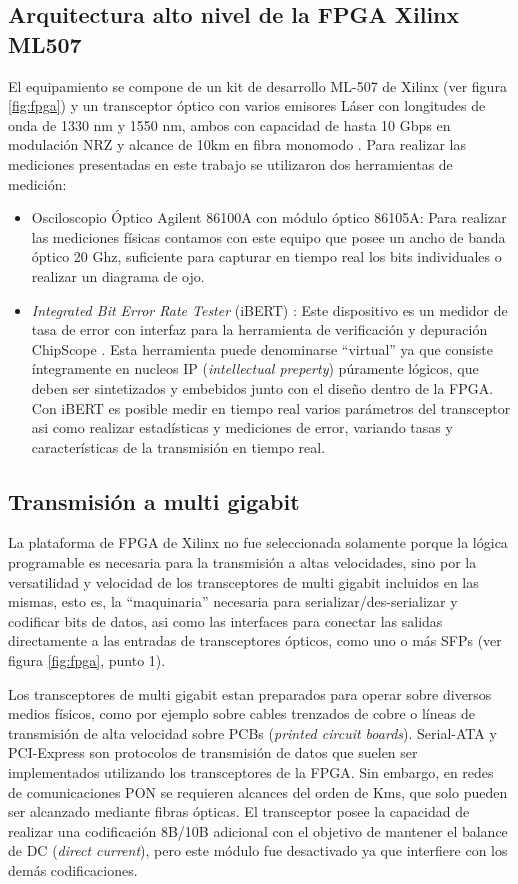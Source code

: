 \subsection{Arquitectura alto nivel de la FPGA Xilinx ML507}
El equipamiento se compone de un kit de desarrollo ML-507 de Xilinx \cite{virtex5fpga} (ver figura \ref{fig:fpga}) y un transceptor óptico con varios emisores Láser con longitudes de onda de 1330 nm y 1550 nm, ambos con capacidad de hasta 10 Gbps en modulación NRZ y alcance de 10km en fibra monomodo \cite{virtex5fpgaRIO}. Para realizar las mediciones presentadas en este trabajo se utilizaron dos herramientas de medición:
\begin{itemize}
 \item Osciloscopio Óptico Agilent 86100A con módulo óptico 86105A: Para
realizar las mediciones físicas contamos con este equipo que posee un
ancho de banda óptico 20 Ghz, suficiente para capturar en
tiempo real los bits individuales o realizar un diagrama de ojo.
\item {\em Integrated Bit Error Rate Tester} (iBERT) \cite{4gtxs}: Este dispositivo es un medidor de tasa de error con interfaz para la herramienta de
verificación y depuración ChipScope \cite{arshak2006testing}. Esta herramienta puede denominarse ``virtual'' ya que consiste íntegramente en nucleos IP (\textit{intellectual preperty}) púramente lógicos, que deben ser sintetizados y embebidos junto con el diseño dentro de la FPGA.
Con iBERT es posible medir en tiempo real varios parámetros del transceptor asi como realizar estadísticas y mediciones de error, variando tasas y características de la transmisión en tiempo real.
 
\end{itemize}
\subsection{Transmisión a multi gigabit}
La plataforma de FPGA de Xilinx no fue seleccionada solamente porque la lógica programable es necesaria para la transmisión a altas velocidades, sino por la versatilidad y velocidad de los transceptores de multi gigabit incluidos en las mismas, esto es, la ``maquinaria'' necesaria para serializar/des-serializar y codificar bits de datos, asi como las interfaces para conectar las salidas directamente a las entradas de transceptores ópticos, como uno o más SFPs \cite{ug198} (ver figura \ref{fig:fpga}, punto 1).

Los transceptores de multi gigabit estan preparados para operar sobre diversos medios físicos, como por ejemplo sobre cables trenzados de cobre o líneas de transmisión de alta velocidad sobre PCBs (\textit{printed circuit boards}). Serial-ATA y PCI-Express son protocolos de transmisión de datos que suelen ser implementados utilizando los transceptores de la FPGA. Sin embargo, en redes de comunicaciones PON se requieren alcances del orden de Kms, que solo pueden ser alcanzado mediante fibras ópticas.  El transceptor posee la capacidad de realizar una codificación 8B/10B \cite{widmer1983dc} adicional con el objetivo de mantener el balance de DC (\textit{direct current}), pero este módulo fue desactivado ya que interfiere con los demás codificaciones.

